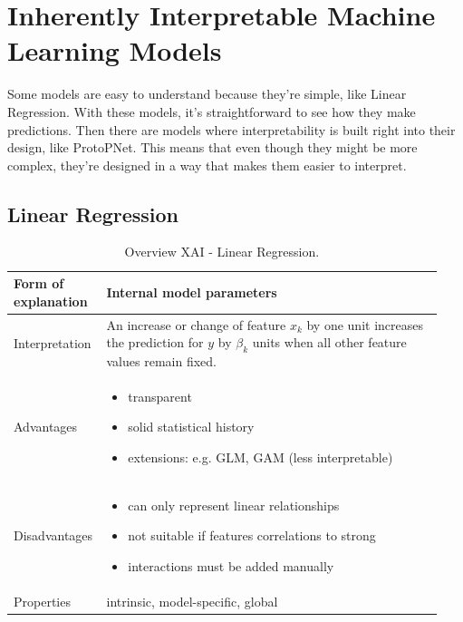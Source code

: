 
\newpage
\section{Inherently Interpretable Machine Learning Models}\label{sec:3}

Some models are easy to understand because they're simple, like Linear Regression. With these models, it's straightforward to see how they make predictions.
Then there are models where interpretability is built right into their design, like ProtoPNet. This means that even though they might be more complex, they're designed in a way that makes them easier to interpret.

\subsection{Linear Regression}

\begin{table}[H]
  \centering
  \begin{tabular}{|p{0.17\linewidth}|p{0.77\linewidth}|}
    \hline
    Form of \newline explanation & 
    Internal model parameters \\
    
    \hline
    Interpretation & 
    An increase or change of feature  $x_k$  by one unit increases the prediction for $y$ by $\beta_k$  units when all other feature values remain fixed. \\
    \hline
    Advantages &
    \begin{itemize}[nosep, left=0em]
        \item transparent 
        \item solid statistical history
        \item extensions: e.g. GLM, GAM (less interpretable)
    \end{itemize} \\
    
    \hline
    Disadvantages &
    \begin{itemize}[nosep, left=0em]
        \item can only represent linear relationships 
        \item not suitable if features correlations to strong
        \item interactions must be added manually
    \end{itemize} \\
    
    \hline
    Properties & 
    intrinsic, model-specific, global  \\
    
    \hline
  \end{tabular}
  \caption{Overview XAI - Linear Regression.}
  \label{tab:XAILinReg}
\end{table}

